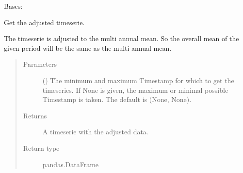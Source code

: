 \documentclass[letterpaper,10pt,english]{sphinxmanual}
\begin{document}
\begin{fulllineitems}
\label{\detokenize{weatherDB:weatherDB.station.StationNBase}}
\sphinxAtStartPar
Bases: {\hyperref[\detokenize{weatherDB:weatherDB.station.StationBase}]{}}

\begin{fulllineitems}
\label{\detokenize{weatherDB:weatherDB.station.StationNBase.get_adj}}
\sphinxAtStartPar
Get the adjusted timeserie.

\sphinxAtStartPar
The timeserie is adjusted to the multi annual mean.
So the overall mean of the given period will be the same as the multi annual mean.
\begin{quote}\begin{description}
\item[{Parameters}] \leavevmode
\sphinxAtStartPar
{} ({\hyperref[\detokenize{weatherDB.lib:weatherDB.lib.utils.TimestampPeriod}]{}}\sphinxstyleliteralemphasis{\sphinxupquote{(}}\sphinxstyleliteralemphasis{\sphinxupquote{)}}\sphinxstyleliteralemphasis{\sphinxupquote{, }}) \textendash{} The minimum and maximum Timestamp for which to get the timeseries.
If None is given, the maximum or minimal possible Timestamp is taken.
The default is (None, None).

\item[{Returns}] \leavevmode
\sphinxAtStartPar
A timeserie with the adjusted data.

\item[{Return type}] \leavevmode
\sphinxAtStartPar
pandas.DataFrame

\end{description}\end{quote}

\end{fulllineitems}


\end{fulllineitems}
\end{document}
